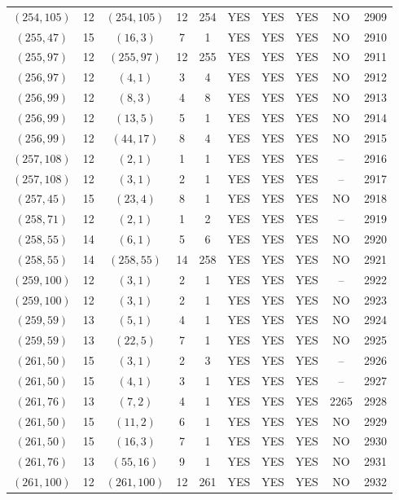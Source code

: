 \begin{longtable}{|c|c|c|c|c|c|c|c|c|c|}
$(254, 105)$ & 12 & $(254, 105)$ & 12 & 254 & YES & YES & YES & NO & 2909\\
$(255, 47)$ & 15 & $(16, 3)$ & 7 & 1 & YES & YES & YES & NO & 2910\\
$(255, 97)$ & 12 & $(255, 97)$ & 12 & 255 & YES & YES & YES & NO & 2911\\
$(256, 97)$ & 12 & $(4, 1)$ & 3 & 4 & YES & YES & YES & NO & 2912\\
$(256, 99)$ & 12 & $(8, 3)$ & 4 & 8 & YES & YES & YES & NO & 2913\\
$(256, 99)$ & 12 & $(13, 5)$ & 5 & 1 & YES & YES & YES & NO & 2914\\
$(256, 99)$ & 12 & $(44, 17)$ & 8 & 4 & YES & YES & YES & NO & 2915\\
$(257, 108)$ & 12 & $(2, 1)$ & 1 & 1 & YES & YES & YES & -- & 2916\\
$(257, 108)$ & 12 & $(3, 1)$ & 2 & 1 & YES & YES & YES & -- & 2917\\
$(257, 45)$ & 15 & $(23, 4)$ & 8 & 1 & YES & YES & YES & NO & 2918\\
$(258, 71)$ & 12 & $(2, 1)$ & 1 & 2 & YES & YES & YES & -- & 2919\\
$(258, 55)$ & 14 & $(6, 1)$ & 5 & 6 & YES & YES & YES & NO & 2920\\
$(258, 55)$ & 14 & $(258, 55)$ & 14 & 258 & YES & YES & YES & NO & 2921\\
$(259, 100)$ & 12 & $(3, 1)$ & 2 & 1 & YES & YES & YES & -- & 2922\\
$(259, 100)$ & 12 & $(3, 1)$ & 2 & 1 & YES & YES & YES & NO & 2923\\
$(259, 59)$ & 13 & $(5, 1)$ & 4 & 1 & YES & YES & YES & NO & 2924\\
$(259, 59)$ & 13 & $(22, 5)$ & 7 & 1 & YES & YES & YES & NO & 2925\\
$(261, 50)$ & 15 & $(3, 1)$ & 2 & 3 & YES & YES & YES & -- & 2926\\
$(261, 50)$ & 15 & $(4, 1)$ & 3 & 1 & YES & YES & YES & -- & 2927\\
$(261, 76)$ & 13 & $(7, 2)$ & 4 & 1 & YES & YES & YES & 2265 & 2928\\
$(261, 50)$ & 15 & $(11, 2)$ & 6 & 1 & YES & YES & YES & NO & 2929\\
$(261, 50)$ & 15 & $(16, 3)$ & 7 & 1 & YES & YES & YES & NO & 2930\\
$(261, 76)$ & 13 & $(55, 16)$ & 9 & 1 & YES & YES & YES & NO & 2931\\
$(261, 100)$ & 12 & $(261, 100)$ & 12 & 261 & YES & YES & YES & NO & 2932\\

\end{longtable}
